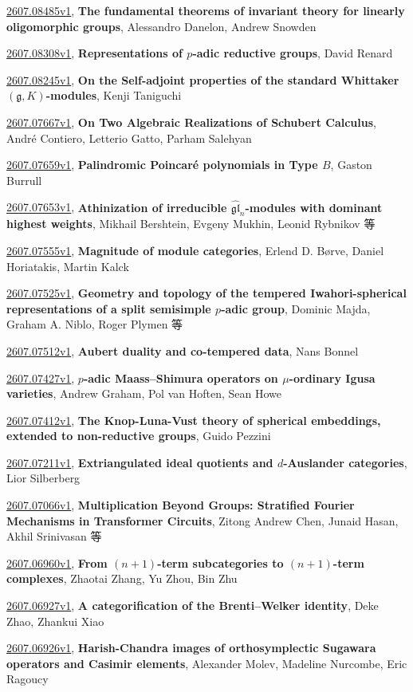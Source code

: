 \documentclass[9pt, a4paper]{article}
\theoremstyle{plain}
\theoremstyle{definition}
\theoremstyle{remark}
\newcommand{\arxiv}[3]{\href{https://arxiv.org/abs/#1}{#1}, \textbf{\textcolor{arxivblue}{#2}}, #3}
\begin{document}
\arxiv{2607.08485v1}{The fundamental theorems of invariant theory for linearly oligomorphic groups}{Alessandro Danelon, Andrew Snowden}

\arxiv{2607.08308v1}{Representations of $p$-adic reductive groups}{David Renard}

\arxiv{2607.08245v1}{On the Self-adjoint properties of the standard Whittaker $(\mathfrak{g}, K)$-modules}{Kenji Taniguchi}

\arxiv{2607.07667v1}{On Two Algebraic Realizations of Schubert Calculus}{André Contiero, Letterio Gatto, Parham Salehyan}

\arxiv{2607.07659v1}{Palindromic Poincaré polynomials in Type $B$}{Gaston Burrull}

\arxiv{2607.07653v1}{Athinization of irreducible $\widehat{\mathfrak{gl}}_n$-modules with dominant highest weights}{Mikhail Bershtein, Evgeny Mukhin, Leonid Rybnikov 等}

\arxiv{2607.07555v1}{Magnitude of module categories}{Erlend D. Børve, Daniel Horiatakis, Martin Kalck}

\arxiv{2607.07525v1}{Geometry and topology of the tempered Iwahori-spherical representations of a split semisimple $p$-adic group}{Dominic Majda, Graham A. Niblo, Roger Plymen 等}

\arxiv{2607.07512v1}{Aubert duality and co-tempered data}{Nans Bonnel}

\arxiv{2607.07427v1}{$p$-adic Maass--Shimura operators on $μ$-ordinary Igusa varieties}{Andrew Graham, Pol van Hoften, Sean Howe}

\arxiv{2607.07412v1}{The Knop-Luna-Vust theory of spherical embeddings, extended to non-reductive groups}{Guido Pezzini}

\arxiv{2607.07211v1}{Extriangulated ideal quotients and $d$-Auslander categories}{Lior Silberberg}

\arxiv{2607.07066v1}{Multiplication Beyond Groups: Stratified Fourier Mechanisms in Transformer Circuits}{Zitong Andrew Chen, Junaid Hasan, Akhil Srinivasan 等}

\arxiv{2607.06960v1}{From $(n+1)$-term subcategories to $(n+1)$-term complexes}{Zhaotai Zhang, Yu Zhou, Bin Zhu}

\arxiv{2607.06927v1}{A categorification of the Brenti--Welker identity}{Deke Zhao, Zhankui Xiao}

\arxiv{2607.06926v1}{Harish-Chandra images of orthosymplectic Sugawara operators and Casimir elements}{Alexander Molev, Madeline Nurcombe, Eric Ragoucy}
\end{document}
